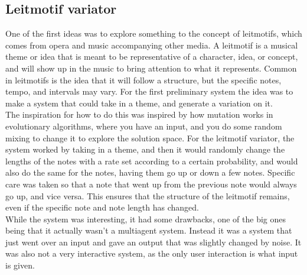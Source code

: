 \documentclass[a4paper,english]{report}
\begin{document}
	\subsection{Leitmotif variator}
	One of the first ideas was to explore something to the concept of leitmotifs, which comes from opera and music accompanying other media. A leitmotif is a musical theme or idea that is meant to be representative of a character, idea, or concept, and will show up in the music to bring attention to what it represents. Common in leitmotifs is the idea that it will follow a structure, but the specific notes, tempo, and intervals may vary. For the first preliminary system the idea was to make a system that could take in a theme, and generate a variation on it.\\
	The inspiration for how to do this was inspired by how mutation works in evolutionary algorithms, where you have an input, and you do some random mixing to change it to explore the solution space. For the leitmotif variator, the system worked by taking in a theme, and then it would randomly change the lengths of the notes with a rate set according to a certain probability, and would also do the same for the notes, having them go up or down a few notes. Specific care was taken so that a note that went up from the previous note would always go up, and vice versa. This ensures that the structure of the leitmotif remains, even if the specific note and note length has changed.\\
	While the system was interesting, it had some drawbacks, one of the big ones being that it actually wasn't a multiagent system. Instead it was a system that just went over an input and gave an output that was slightly changed by noise. It was also not a very interactive system, as the only user interaction is what input is given.
	
\end{document}
